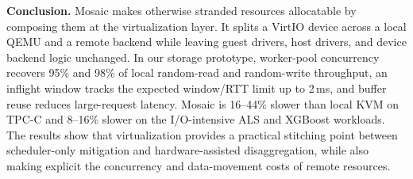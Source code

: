\documentclass[sigplan,10pt]{acmart}
\begin{document}
\noindent\textbf{Conclusion.} Mosaic makes otherwise stranded resources allocatable by composing them at the virtualization layer. It splits a VirtIO device across a local QEMU and a remote backend while leaving guest drivers, host drivers, and device backend logic unchanged. In our storage prototype, worker-pool concurrency recovers 95\% and 98\% of local random-read and random-write throughput, an inflight window tracks the expected window/RTT limit up to 2\,ms, and buffer reuse reduces large-request latency. Mosaic is 16--44\% slower than local KVM on TPC-C and 8--16\% slower on the I/O-intensive ALS and XGBoost workloads. The results show that virtualization provides a practical stitching point between scheduler-only mitigation and hardware-assisted disaggregation, while also making explicit the concurrency and data-movement costs of remote resources.

\newpage


\end{document}

